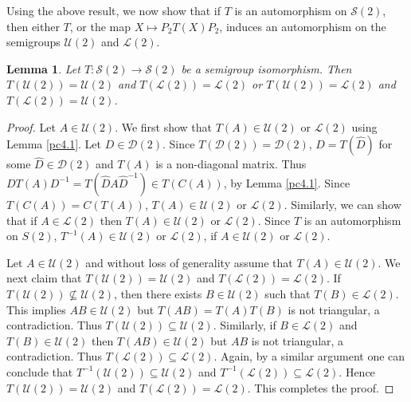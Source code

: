 \documentclass[11pt,reqno]{amsart}
\theoremstyle{plain}
\newtheorem{lemma}[theorem]{Lemma}
\theoremstyle{definition}
\numberwithin{equation}{section}
\def\cS{\mathcal S}
\def\cD{\mathcal D}
\def\cU{\mathcal U}
\def\cL{\mathcal L}
\begin{document}
Using the above result, we now show that if $T$ is an automorphism on $\mathcal S(2)$, then either $T$, or the map $X \mapsto P_2 T(X) P_2$, induces an automorphism on the semigroups $\mathcal U(2)$ and $\mathcal L(2)$.%


\begin{lemma}\label{pc4.2}
	Let $T: \cS(2) \to \cS(2)$ be a semigroup isomorphism. Then $ T(\cU(2)) = \cU(2)$ and $ T(\cL(2))=\cL(2)$ or $ T(\cU(2)) = \cL(2)$ and $ T(\cL(2))=\cU(2)$. 
\end{lemma}
\begin{proof}
	Let $A\in \cU(2)$. We first show that $ T(A)\in \cU(2)$ or $\cL(2)$ using Lemma \ref{pc4.1}. Let $D\in \cD(2)$. Since $T(\cD(2))=\cD(2)$, $D=T(\hat D)$ for some $\hat D\in \cD(2)$ and $T(A)$ is a non-diagonal matrix. Thus $DT(A)D^{-1}=T(\hat D A {\hat D}^{-1})\in T(C(A))$,  by Lemma \ref{pc4.1}. Since $ T(C(A))=C(T(A))$,  $T(A)\in \cU(2)$ or $\cL(2)$. Similarly, we can show that  if $A\in \cL(2)$ then $T(A)\in \cU(2)$ or $\cL(2)$. Since $T$ is an automorphism on $S(2)$, $T^{-1}(A)\in \cU(2)$ or $\cL(2)$, if $A\in \cU(2)$ or $\cL(2)$. 
	
	Let $A\in \cU(2)$ and without loss of generality assume that $T(A)\in \cU(2)$. We next claim that $T(\cU(2))= \cU(2)$ and $T(\cL(2))= \cL(2)$. If $T(\cU(2)) \nsubseteq \cU(2)$, then there exists $B\in \cU(2)$ such that $T(B)\in \cL(2)$. This implies $AB \in \cU(2)$ but $T(AB)=T(A) T(B)$ is not triangular, a contradiction. Thus $ T(\cU(2)) \subseteq \cU(2)$.  Similarly, if $B \in \cL(2)$ and $T(B)\in \cU(2)$ then $T(AB)\in \cU(2)$ but $AB$ is not triangular, a contradiction. Thus  $T(\cL(2))\subseteq \cL(2)$. Again, by a similar argument one can conclude that $ T^{-1}(\cU(2)) \subseteq \cU(2)$ and  $T^{-1}(\cL(2))\subseteq \cL(2)$. Hence  $T(\cU(2))= \cU(2)$ and $T(\cL(2))= \cL(2)$. This completes the proof.
\end{proof}
\end{document}
